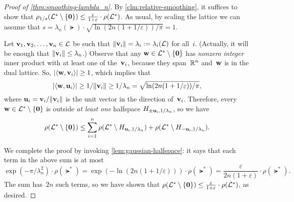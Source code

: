 \documentclass[11pt]{article}
\begin{document}
\begin{proof}[Proof of \cref{thm:smoothing-lambda_n}]
  By \cref{clm:relative-smoothing}, it suffices to show that
  $\rho_{1/s}(\mathcal{L}^* \setminus \{\mathbf{0}\}) \leq
  \frac{\varepsilon}{1+\varepsilon} \cdot \rho(\mathcal{L}^{*})$. As usual,
  by scaling the lattice we can assume that
  $s = \lambda_{n}(\lat) \cdot \sqrt{\ln(2n(1+1/\varepsilon))/\pi} =
  1$.

  Let $\mathbf{v}_{1}, \mathbf{v}_{2}, \ldots, \mathbf{v}_{n} \in \mathcal{L}$ be such that
  $\lVert\mathbf{v}_{i}\rVert = \lambda_{i} := \lambda_{i}(\mathcal{L})$ for all~$i$.
  (Actually, it will be enough that
  $\lVert\mathbf{v}_{i}\rVert \leq \lambda_{n}$.) Observe that any
  $\mathbf{w} \in \mathcal{L}^{*} \setminus \{\mathbf{0}\}$ has \emph{nonzero
    integer} inner product with at least one of the~$\mathbf{v}_{i}$,
  because they span~$\mathbb{R}^{n}$ and~$\mathbf{w}$ is in the dual lattice. So,
  $\lvert\langle\mathbf{w}, \mathbf{v}_{i}\rangle\rvert \geq 1$, which implies that
  \[ \lvert\langle\mathbf{w}, \mathbf{u}_{i}\rangle\rvert \geq 1/\lVert\mathbf{v}_{i}\rVert \geq
    1/\lambda_{n} = \sqrt{\ln(2n(1+1/\varepsilon))/\pi} , \] where
  $\mathbf{u}_{i} = \mathbf{v}_{i}/\lVert\mathbf{v}_{i}\rVert$ is the unit vector in the
  direction of~$\mathbf{v}_{i}$. Therefore, every
  $\mathbf{w} \in \mathcal{L}^{*} \setminus \{\mathbf{0}\}$ is outside \emph{at
    least one} halfspace $H_{\pm \mathbf{u}_{i}, 1/\lambda_{n}}$, so we
  have
  \[
    \rho(\mathcal{L}^{*} \setminus \{\mathbf{0}\}) \leq \sum_{i=1}^{n}
    \rho(\mathcal{L}^{*} \setminus H_{\mathbf{u}_{i}, 1/\lambda_{n}}) +
    \rho(\mathcal{L}^{*} \setminus H_{-\mathbf{u}_{i}, 1/\lambda_{n}}) .
  \]
  
  We complete the proof by invoking \cref{lem:gaussian-halfspace}: it
  says that each term in the above sum is at most
  \[ \exp(-\pi / \lambda_{n}^{2}) \cdot \rho(\lat^{*}) =
    \exp(-\ln(2n(1+1/\varepsilon))) \cdot \rho(\lat^{*}) =
    \frac{\varepsilon}{2n(1+\varepsilon)} \cdot \rho(\lat^{*}). \] The
  sum has~$2n$ such terms, so we have shown that
  $\rho(\mathcal{L}^{*} \setminus \{\mathbf{0}\}) \leq
  \frac{\varepsilon}{1+\varepsilon} \cdot \rho(\mathcal{L}^{*})$, as desired.
\end{proof}



\end{document}
